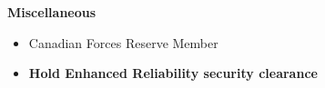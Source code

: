 \documentclass[letterpaper,11pt]{article}
\makeatletter
\newcommand{\resitem}[1]{\item #1 \vspace{-2pt}}
\newcommand{\resheading}[1]{{\large \colorbox{mygrey}{\begin{minipage}{\textwidth}{\textbf{#1 \vphantom{p\^{E}} }}\end{minipage}} }}
\newcommand{\ressubheading}[4]{
\begin{tabular*}{6.5in}{l@{\extracolsep{\fill}}r}
        \textbf{#1} & #2 \\
        \textit{#3} & \textit{#4} \\
\end{tabular*}\vspace{-6pt}}
\makeatother
\begin{document}
\begin{comment}
\resheading{Professional Development} %
    \begin{itemize}
        \item[]
            \ressubheading{Regional Cadet Instructor School (Atlantic)}{Shearwater NS}{Captain Qualification Course}{Jan. 2012 - Mar. 2012}
            \begin{itemize}
                \resitem{Four weekends of training}
                \resitem{Training Topics: military writing, communicating with the public, situational leadership, communicating effectively, leading a meeting}
            \end{itemize}
        \item[]
            \ressubheading{Regional Cadet Instructor School (Atlantic)}{Shearwater NS}{Lieutenant Qualification Course}{Oct. 2010 - 4 Dec. 2010}
            \begin{itemize}
                \resitem{Four weekends of training}
                \resitem{Training Topics: military writing, counseling, developing a training schedule}
            \end{itemize}
        \item[]
            \ressubheading{Regional Cadet Instructor School (Atlantic)}{Gagetown NB}{Military Occupation Code Course}{June 2007}
            \begin{itemize}
                \resitem{Ten days of training}
                \resitem{Training Topics: seamanship, sailing, lifting devices, nautical navigation}
            \end{itemize}
        \item[]
            \ressubheading{Regional Cadet Instructor School (Atlantic)}{Gagetown NB}{Basic Officer Qualification}{June 2007}
            \begin{itemize}
                \resitem{Ten days of training}
                \resitem{Training Topics: military writing, drill, instruction, military ranks and processes}
            \end{itemize}
    \end{itemize}
\end{comment}

\resheading{{Miscellaneous}} %
    \begin{itemize}
        \item Canadian Forces Reserve Member
        \item \bf Hold Enhanced Reliability security clearance
    \end{itemize}
\end{document}
